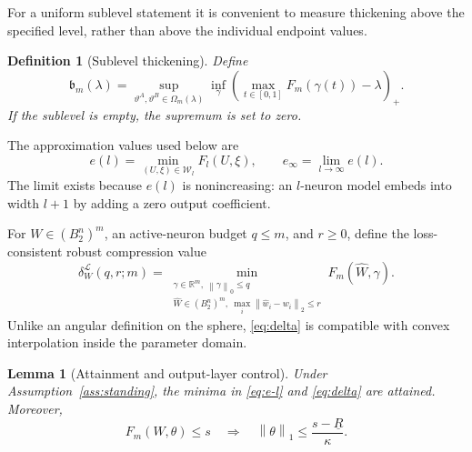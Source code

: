 \documentclass[pdflatex,sn-mathphys-num]{sn-jnl}
\theoremstyle{thmstyleone}
\newtheorem{lemma}[theorem]{Lemma}
\theoremstyle{thmstyletwo}
\theoremstyle{thmstylethree}
\newtheorem{definition}{Definition}[section]
\newcommand{\R}{\mathbb{R}}
\newcommand{\norm}[1]{\left\lVert #1 \right\rVert}
\newcommand{\SubBar}{\mathfrak b}
\begin{document}
For a uniform sublevel statement it is convenient to measure thickening above the specified level, rather than above the individual endpoint values.

\begin{definition}[Sublevel thickening]\label{def:thickening}
Define
\begin{equation}
\SubBar_m(\lambda)
=\sup_{\vartheta^A,\vartheta^B\in\Omega_m(\lambda)}
\inf_{\gamma}
\left(\max_{t\in[0,1]}F_m(\gamma(t))-\lambda\right)_+.
\label{eq:thickening}
\end{equation}
If the sublevel is empty, the supremum is set to zero.
\end{definition}

The approximation values used below are
\begin{equation}
e(l)
=\min_{(U,\xi)\in\mathcal W_l}F_l(U,\xi),
\qquad
e_\infty=\lim_{l\to\infty}e(l).
\label{eq:e-l}
\end{equation}
The limit exists because $e(l)$ is nonincreasing: an $l$-neuron model embeds into width $l+1$ by adding a zero output coefficient.

For $W\in(B_2^n)^m$, an active-neuron budget $q\le m$, and $r\ge0$, define the loss-consistent robust compression value
\begin{equation}
\delta_W^{\mathcal L}(q,r;m)
=\min_{\substack{\gamma\in\R^m,\ \norm{\gamma}_0\le q\\
\widehat W\in(B_2^n)^m,\ \max_i\norm{\hat w_i-w_i}_2\le r}}
F_m(\widehat W,\gamma).
\label{eq:delta}
\end{equation}
Unlike an angular definition on the sphere, \eqref{eq:delta} is compatible with convex interpolation inside the parameter domain.

\begin{lemma}[Attainment and output-layer control]\label{lem:attainment}
Under Assumption~\ref{ass:standing}, the minima in \eqref{eq:e-l} and \eqref{eq:delta} are attained. Moreover,
\begin{equation}
F_m(W,\theta)\le s
\quad\Longrightarrow\quad
\norm{\theta}_1\le\frac{s-\underline R}{\kappa}.
\label{eq:l1-control}
\end{equation}
\end{lemma}
\end{document}
